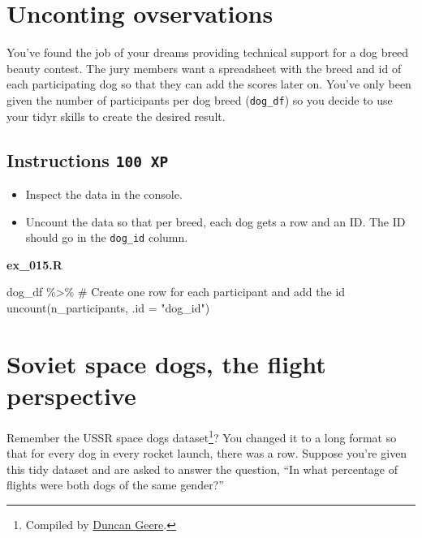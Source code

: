 \documentclass[
  letterpaper,
  DIV=11,
  numbers=noendperiod]{scrreprt}
\newenvironment{Shaded}{\begin{snugshade}}{\end{snugshade}}
\newcommand{\AttributeTok}[1]{\textcolor[rgb]{0.40,0.45,0.13}{#1}}
\newcommand{\CommentTok}[1]{\textcolor[rgb]{0.37,0.37,0.37}{#1}}
\newcommand{\FunctionTok}[1]{\textcolor[rgb]{0.28,0.35,0.67}{#1}}
\newcommand{\NormalTok}[1]{\textcolor[rgb]{0.00,0.23,0.31}{#1}}
\newcommand{\SpecialCharTok}[1]{\textcolor[rgb]{0.37,0.37,0.37}{#1}}
\newcommand{\StringTok}[1]{\textcolor[rgb]{0.13,0.47,0.30}{#1}}
\providecommand{\tightlist}{%
  \setlength{\itemsep}{0pt}\setlength{\parskip}{0pt}}\usepackage{longtable,booktabs,array}
\begin{document}
\hypertarget{unconting-ovservations}{%
\section{Unconting ovservations}\label{unconting-ovservations}}

You've found the job of your dreams providing technical support for a
dog breed beauty contest. The jury members want a spreadsheet with the
breed and id of each participating dog so that they can add the scores
later on. You've only been given the number of participants per dog
breed (\texttt{dog\_df}) so you decide to use your tidyr skills to
create the desired result.

\hypertarget{instructions-100-xp-12}{%
\subsection*{\texorpdfstring{Instructions
\texttt{100\ XP}}{Instructions 100 XP}}\label{instructions-100-xp-12}}

\begin{itemize}
\tightlist
\item
  Inspect the data in the console.
\item
  Uncount the data so that per breed, each dog gets a row and an ID. The
  ID should go in the \texttt{dog\_id} column.
\end{itemize}

\textbf{ex\_015.R}

\begin{Shaded}
\begin{Highlighting}[]
\NormalTok{dog\_df }\SpecialCharTok{\%\textgreater{}\%} 
  \CommentTok{\# Create one row for each participant and add the id}
  \FunctionTok{uncount}\NormalTok{(n\_participants, }\AttributeTok{.id =} \StringTok{"dog\_id"}\NormalTok{)}
\end{Highlighting}
\end{Shaded}

\hypertarget{soviet-space-dogs-the-flight-perspective}{%
\section{Soviet space dogs, the flight
perspective}\label{soviet-space-dogs-the-flight-perspective}}

Remember the USSR space dogs dataset\footnote{Compiled by
  \href{https://airtable.com/universe/expG3z2CFykG1dZsp/soviet-space-dogs}{Duncan
  Geere}.}? You changed it to a long format so that for every dog in
every rocket launch, there was a row. Suppose you're given this tidy
dataset and are asked to answer the question, ``In what percentage of
flights were both dogs of the same gender?''
\end{document}
